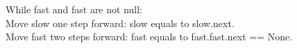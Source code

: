 \documentclass[preview]{standalone}
\begin{document}
While fast and fast are not null:\\Move slow one step forward: slow equals to slow.next.\\Move fast two steps forward: fast equals to fast.fast.next == None.\\
\end{document}
